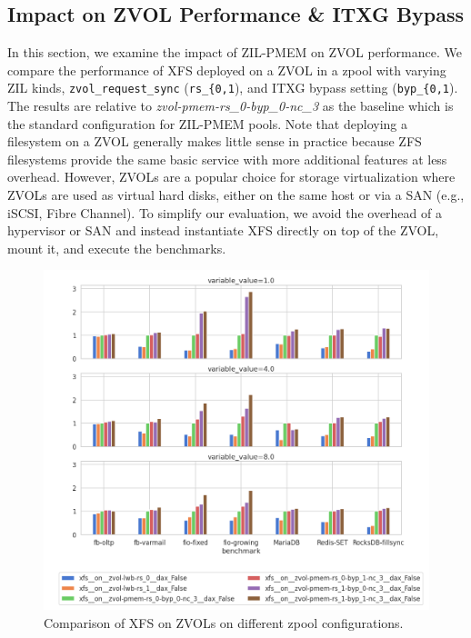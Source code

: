 \documentclass[12pt,a4paper,twoside]{book}
\begin{document}
\subsection{Impact on ZVOL Performance \& ITXG Bypass}

In this section, we examine the impact of ZIL-PMEM on ZVOL performance.
We compare the performance of XFS deployed on a ZVOL in a zpool with varying ZIL kinds, \lstinline{zvol_request_sync} (\lstinline{rs_{0,1}), and ITXG bypass setting (\lstinline{byp_{0,1}).
The results are relative to \textit{zvol-pmem-rs\_0-byp\_0-nc\_3} as the baseline which is the standard configuration for ZIL-PMEM pools.
Note that deploying a filesystem on a ZVOL generally makes little sense in practice because ZFS filesystems provide the same basic service with more additional features at less overhead.
However, ZVOLs are a popular choice for storage virtualization where ZVOLs are used as virtual hard disks, either on the same host or via a SAN (e.g., iSCSI, Fibre Channel).
To simplify our evaluation, we avoid the overhead of a hypervisor or SAN and instead instantiate XFS directly on top of the ZVOL, mount it, and execute the benchmarks.

\begin{figure}[H]
    \centering
    \includegraphics[width=\textwidth]{fig/evaluation/app_benchmarks__zvol_xfs}
    \caption{
        Comparison of XFS on ZVOLs on different zpool configurations.
    }
\end{figure}
\end{document}
